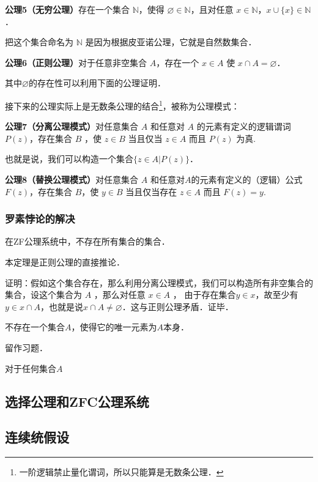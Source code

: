 \textbf{公理5（无穷公理）}存在一个集合 $\mathbb{N}$，使得 $\varnothing\in\mathbb{N}$，且对任意 $x\in \mathbb{N}$，$x\cup\{x\}\in\mathbb{N}$．

把这个集合命名为 $\mathbb{N}$ 是因为根据皮亚诺公理，它就是自然数集合．

\textbf{公理6（正则公理）}对于任意非空集合 $A$，存在一个 $x\in A$ 使 $x\cap A=\varnothing$．

其中$\varnothing$的存在性可以利用下面的公理证明．

接下来的公理实际上是无数条公理的结合\footnote{一阶逻辑禁止量化谓词，所以只能算是无数条公理．}，被称为公理模式：

\textbf{公理7（分离公理模式）}对任意集合 $A$ 和任意对 $A$ 的元素有定义的逻辑谓词 $P(z)$，存在集合 $B$ ，使 $z\in B$ 当且仅当 $z\in A$ 而且 $P(z)$ 为真.

也就是说，我们可以构造一个集合$\{z\in A | P(z)\}$．

\textbf{公理8（替换公理模式）}对任意集合 $A$ 和任意对$A$的元素有定义的（逻辑）公式$F(z)$，存在集合 $B$，使 $y\in B$ 当且仅当存在 $z\in A$ 而且 $F(z)=y$.

\subsubsection{罗素悖论的解决}
\begin{theorem}{}
在ZF公理系统中，不存在所有集合的集合．
\end{theorem}

本定理是正则公理的直接推论．

证明：假如这个集合存在，那么利用分离公理模式，我们可以构造所有非空集合的集合，设这个集合为 $A$ ，那么对任意 $x\in A$ ， 由于存在集合$y\in x$，故至少有$y\in x\cap A$，也就是说$x\cap A\neq\varnothing$．这与正则公理矛盾．证毕．

\begin{lemma}{}
不存在一个集合$A$，使得它的唯一元素为$A$本身．
\end{lemma}

留作习题．

\begin{theorem}{}
对于任何集合$A$
\end{theorem}

\subsection{选择公理和ZFC公理系统}

\subsection{连续统假设}



